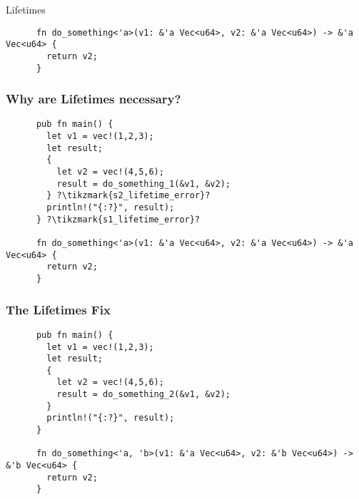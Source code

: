 \begin{section}{Lifetimes}
\begin{frame}[fragile]
\begin{verbatim}
      fn do_something<'a>(v1: &'a Vec<u64>, v2: &'a Vec<u64>) -> &'a Vec<u64> {
        return v2;
      }
    \end{verbatim}
  \end{frame}

  \begin{frame}[fragile]
    \frametitle{Why are Lifetimes necessary?}
    \begin{verbatim}
      pub fn main() {
        let v1 = vec!(1,2,3);
        let result;
        {
          let v2 = vec!(4,5,6);
          result = do_something_1(&v1, &v2);
        } ?\tikzmark{s2_lifetime_error}?
        println!("{:?}", result);
      } ?\tikzmark{s1_lifetime_error}?

      fn do_something<'a>(v1: &'a Vec<u64>, v2: &'a Vec<u64>) -> &'a Vec<u64> {
        return v2;
      }
    \end{verbatim}
  \end{frame}

  \begin{frame}[fragile]
    \frametitle{The Lifetimes Fix}
    \begin{verbatim}
      pub fn main() {
        let v1 = vec!(1,2,3);
        let result;
        {
          let v2 = vec!(4,5,6);
          result = do_something_2(&v1, &v2);
        }
        println!("{:?}", result);
      }

      fn do_something<'a, 'b>(v1: &'a Vec<u64>, v2: &'b Vec<u64>) -> &'b Vec<u64> {
        return v2;
      }
    \end{verbatim}
  \end{frame}

\end{section}
